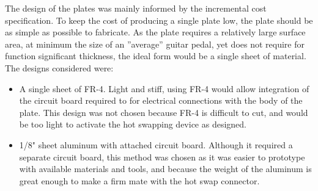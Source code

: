 		The design of the plates was mainly informed by the incremental cost specification. To keep the cost of producing a single plate low, the plate should be as simple as possible to fabricate. As the plate requires a relatively large surface area, at minimum the size of an ”average” guitar pedal, yet does not require for function significant thickness, the ideal form would be a single sheet of material.  The designs considered were:

		\begin{itemize}
			\item A single sheet of FR-4.  Light and stiff, using FR-4 would allow integration of the circuit board required to for electrical connections with the body of the plate.  This design was not chosen because FR-4 is difficult to cut, and would be too light to activate the hot swapping device as designed.
			\item 1/8" sheet aluminum with attached circuit board.  Although it required a separate circuit board, this method was chosen as it was easier to prototype with available materials and tools, and because the weight of the aluminum is great enough to make a firm mate with the hot swap connector.
		\end{itemize}

